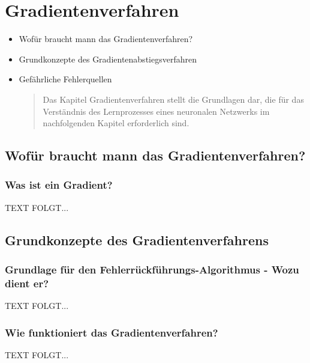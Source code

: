 \newpage
\thispagestyle{empty}
\section{Gradientenverfahren}\label{sec:gradientenverfahren}   
\begin{tcolorbox}[title={Inhalte des \textit{Gradientenverfahren}}]
  \begin{itemize}
    \item Wofür braucht mann das Gradientenverfahren?
    \item Grundkonzepte des Gradientenabstiegsverfahren
    \item Gefährliche Fehlerquellen
  \begin{quotation}
      Das Kapitel Gradientenverfahren stellt die Grundlagen dar, die für das Verständnis des Lernprozesses eines neuronalen Netzwerks im nachfolgenden Kapitel erforderlich sind.
  \end{quotation}
  \end{itemize}
\end{tcolorbox}


\subsection{Wofür braucht mann das Gradientenverfahren?}\label{subsec:gradientenverfahren:wofuer}
\subsubsection{Was ist ein Gradient?}\label{subsec:gradientenverfahren:was_ist_gradient}
  TEXT FOLGT...


\subsection{Grundkonzepte des Gradientenverfahrens}\label{subsec:gradientenverfahren:grundkonzepte}
\subsubsection{Grundlage für den Fehlerrückführungs-Algorithmus - Wozu dient er?}\label{subsec:gradientenverfahren:grundlage_fehlerrueckfuehrungsalg}
  TEXT FOLGT...

\subsubsection{Wie funktioniert das Gradientenverfahren?}\label{subsec:gradientenverfahren:wie_funktioniert}
  TEXT FOLGT...

